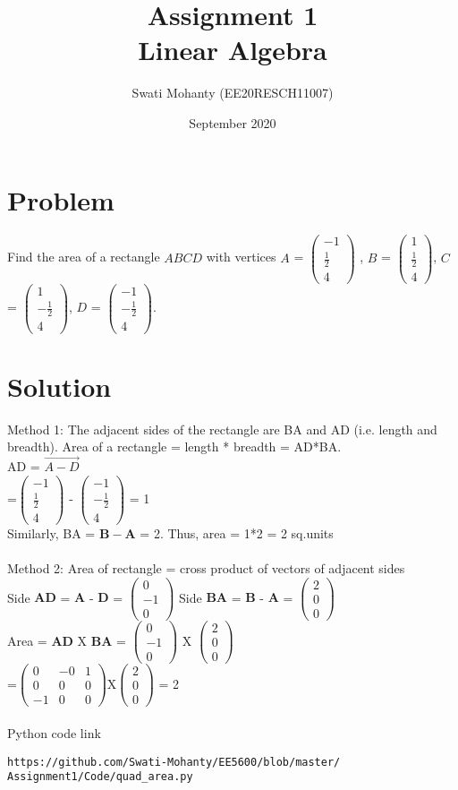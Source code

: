 \documentclass{article}
\title{Assignment 1
\\Linear Algebra }
\author{Swati Mohanty (EE20RESCH11007) }
\date{September 2020}
\newcommand{\myvec}[1]{\ensuremath{\begin{pmatrix}#1\end{pmatrix}}}
\let\vec\mathbf
\begin{document}
\maketitle


\section{Problem}
Find the area of a rectangle $ABCD$ with vertices $A$ = \myvec{-1 \\\frac{1}{2} \\4} , $B$ = \myvec{1 \\\frac{1}{2} \\4}, $C$ = \myvec{1 \\-\frac{1}{2} \\4}, $D$ = \myvec{-1 \\-\frac{1}{2} \\4}.
\section{Solution}
Method 1: The adjacent sides of the rectangle are BA and AD (i.e. length and breadth). Area of a rectangle = length * breadth = AD*BA.
\\AD = $\Vec{A-D}$
\\=\myvec{-1 \\\frac{1}{2} \\4} - \myvec{-1 \\-\frac{1}{2} \\4} = 1
\\Similarly, BA =  $\vec{B-A}$   = 2. Thus, area = 1*2 = 2 sq.units
\\
\\Method 2: Area of rectangle = cross product of vectors of adjacent sides
\\Side $\vec{AD}$ = $\vec{A}$ - $\vec{D}$ = \myvec{0 \\-1 \\0}  Side $\vec{BA}$  = $\vec{B}$ - $\vec{A}$ = \myvec{2 \\0 \\0}
\\Area = $\vec{AD} $  X  $\vec{BA} $  = \myvec{0 \\-1 \\0}  X \myvec{2 \\0 \\0}
\\=\myvec{0&-0&1 \\0&0&0 \\-1&0&0}X\myvec{2 \\0 \\0} = 2
\\
\\Python code link 
\begin{lstlisting}
https://github.com/Swati-Mohanty/EE5600/blob/master/
Assignment1/Code/quad_area.py
\end{lstlisting}
\end{document}
